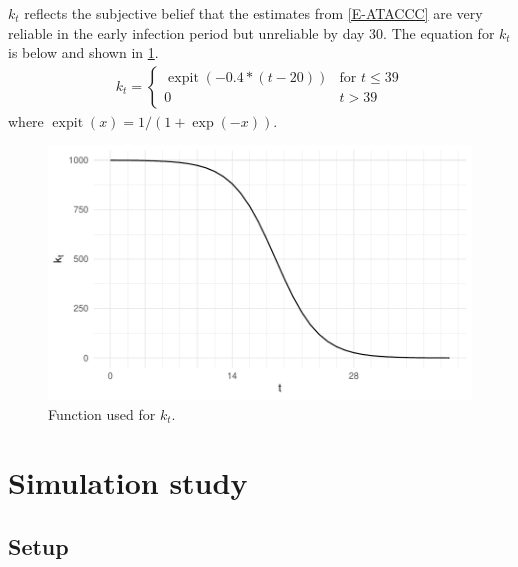 \documentclass[12pt, letterpaper]{article} %
\DeclareMathOperator{\expit}{expit}
\begin{document}
$k_t$ reflects the subjective belief that the estimates from \cref{E-ATACCC} are very reliable in the early infection period but unreliable by day 30.
The equation for $k_t$ is below and shown in \cref{perf-test:fig:kt}.
\begin{align}
k_t = \begin{cases}
  \expit(-0.4 * (t - 20)) &\text{for $t \leq 39$} \\
  0 &t > 39
\end{cases}
\end{align}
where $\expit(x) = 1 / (1 + \exp(-x))$.

\begin{figure}
  \centering \includegraphics{cis-perfect-testing/kt-prior}
  \caption{Function used for $k_t$. \label{perf-test:fig:kt}}
\end{figure}

\section{Simulation study}

\subsection{Setup}
\end{document}
